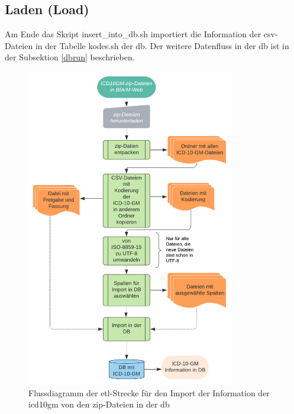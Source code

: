 \subsection{Laden (Load)}

Am Ende das Skript \textsf{insert\_into\_db.sh} importiert die Information der \ac{csv}-Dateien in der Tabelle \textsf{kodes.sh} der \ac{db}. Der weitere Datenfluss in der \ac{db} ist in der Subsektion \ref{dbrun} beschrieben.
\newpage
	\begin{figure}[ht]
		\centering
		\includegraphics[height=14cm]{figures/etl}
		\caption[\acs{etl}-Strecke]{Flussdiagramm der \acs{etl}-Strecke für den Import der Information der \ac{icd10gm} von den \ac{zip}-Dateien in der \ac{db} }
		\label{fig:etl}
	\end{figure} 
	